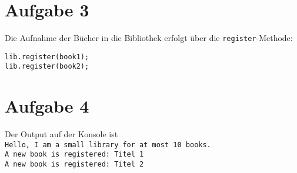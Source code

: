 \documentclass{article}
\begin{document}
	\section*{Aufgabe 3}
	Die Aufnahme der Bücher in die Bibliothek erfolgt über die \texttt{register}-Methode:
	\begin{lstlisting}[style=java]
lib.register(book1);
lib.register(book2);
	\end{lstlisting}

	\section*{Aufgabe 4}
	Der Output auf der Konsole ist \\
	\texttt{Hello, I am a small library for at most 10 books. \\
	A new book is registered: Titel 1 \\
	A new book is registered: Titel 2}
	
\end{document}
